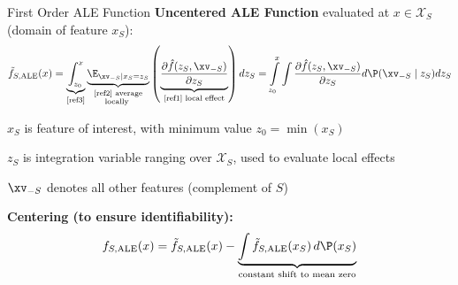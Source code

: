 \documentclass[10pt,compress,t,notes=noshow, xcolor=table]{beamer}
\begin{document}

\begin{framev}[align=top]{First Order ALE Function}
\textbf{Uncentered ALE Function} evaluated at $x \in \mathcal{X}_S$ (domain of feature $x_S$):
$$
\tilde{f}_{S, \text{ALE}}(x)
= \underbrace{\int_{z_0}^{x}}_{\text{\eqref{ref3}}}
\underbrace{\E_{\xv_{-S} \mid x_S = z_S}}_{\substack{\text{\eqref{ref2} average} \\ \text{locally }}}
\left( \underbrace{\frac{\partial \hat{f}(z_S, \xv_{-S})}{\partial z_S}}_{\text{\eqref{ref1} local effect}} \right) dz_S
= \int\limits_{z_0}^{x} \int \frac{\partial \hat{f}(z_S, \xv_{-S})}{\partial z_S} d\P(\xv_{-S} \mid z_S) dz_S
$$
\begin{itemizeM}
\item $x_S$ is feature of interest, with minimum value $z_0 = \min(x_S)$
\item $z_S$ is integration variable ranging over $\mathcal{X}_S$, used to evaluate local effects
\item $\xv_{-S}$ denotes all other features (complement of $S$)
\end{itemizeM}
\pause
\spacer[0.25]
\textbf{Centering (to ensure identifiability):}
$$
f_{S, \text{ALE}}(x) = \tilde{f}_{S, \text{ALE}}(x)
- \underbrace{\int \tilde{f}_{S, \text{ALE}}(x_S) \, d\P(x_S)}_{\text{constant shift to mean zero}}
$$
\end{framev}




\end{document}
